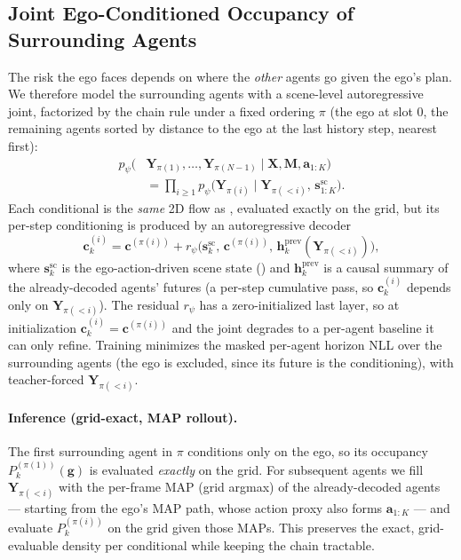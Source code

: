 \documentclass[journal]{IEEEtran}
\begin{document}
\subsection{Joint Ego-Conditioned Occupancy of Surrounding Agents}\label{sec:scene_joint}
The risk the ego faces depends on where the \emph{other} agents go given the ego's plan. We therefore model the surrounding agents with a scene-level autoregressive joint, factorized by the chain rule under a fixed ordering $\pi$ (the ego at slot $0$, the remaining agents sorted by distance to the ego at the last history step, nearest first):
\begin{equation}
\begin{split}
p_{\psi}\big(&\mathbf{Y}_{\pi(1)},\dots,\mathbf{Y}_{\pi(N-1)}\mid\mathbf{X},\mathbf{M},\mathbf{a}_{1:K}\big)\\
&=\prod_{i\ge 1} p_{\psi}\big(\mathbf{Y}_{\pi(i)}\mid\mathbf{Y}_{\pi(<i)},\,\mathbf{s}^{\mathrm{sc}}_{1:K}\big).
\end{split}
\label{eq:scene_joint}
\end{equation}
Each conditional is the \emph{same} 2D flow as , evaluated exactly on the grid, but its per-step conditioning is produced by an autoregressive decoder
\begin{equation}
\mathbf{c}^{(i)}_k = \mathbf{c}^{(\pi(i))} + r_{\psi}\big(\mathbf{s}^{\mathrm{sc}}_k,\,\mathbf{c}^{(\pi(i))},\,\mathbf{h}^{\mathrm{prev}}_{k}(\mathbf{Y}_{\pi(<i)})\big),
\label{eq:ar_cond}
\end{equation}
where $\mathbf{s}^{\mathrm{sc}}_k$ is the ego-action-driven scene state () and $\mathbf{h}^{\mathrm{prev}}_k$ is a causal summary of the already-decoded agents' futures (a per-step cumulative pass, so $\mathbf{c}^{(i)}_k$ depends only on $\mathbf{Y}_{\pi(<i)}$). The residual $r_{\psi}$ has a zero-initialized last layer, so at initialization $\mathbf{c}^{(i)}_k=\mathbf{c}^{(\pi(i))}$ and the joint degrades to a per-agent baseline it can only refine. Training minimizes the masked per-agent horizon NLL over the surrounding agents (the ego is excluded, since its future is the conditioning), with teacher-forced $\mathbf{Y}_{\pi(<i)}$.

\paragraph{Inference (grid-exact, MAP rollout).} The first surrounding agent in $\pi$ conditions only on the ego, so its occupancy $P^{(\pi(1))}_k(\mathbf{g})$ is evaluated \emph{exactly} on the grid. For subsequent agents we fill $\mathbf{Y}_{\pi(<i)}$ with the per-frame MAP (grid argmax) of the already-decoded agents --- starting from the ego's MAP path, whose action proxy also forms $\mathbf{a}_{1:K}$ --- and evaluate $P^{(\pi(i))}_k$ on the grid given those MAPs. This preserves the exact, grid-evaluable density per conditional while keeping the chain tractable.
\end{document}
